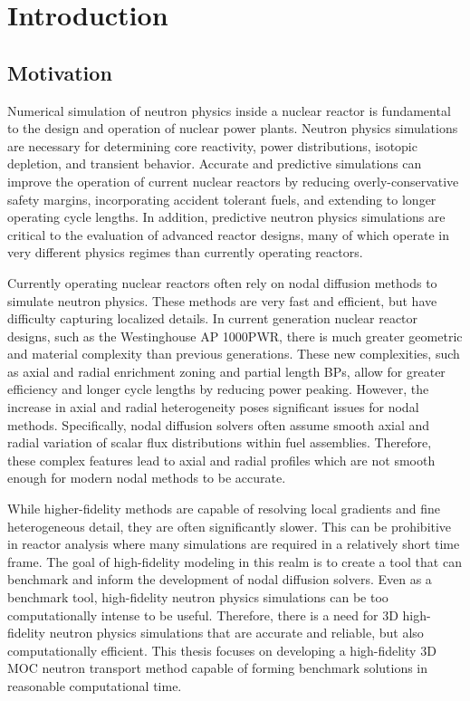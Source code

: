 \chapter{Introduction}
\label{chap:intro}

\section{Motivation}
\label{sec:chap1-motivation}


Numerical simulation of neutron physics inside a nuclear reactor is fundamental to the design and operation of nuclear power plants. Neutron physics simulations are necessary for determining core reactivity, power distributions, isotopic depletion, and transient behavior. Accurate and predictive simulations can improve the operation of current nuclear reactors by reducing overly-conservative safety margins, incorporating accident tolerant fuels, and extending to longer operating cycle lengths. In addition, predictive neutron physics simulations are critical to the evaluation of advanced reactor designs, many of which operate in very different physics regimes than currently operating reactors. 

Currently operating nuclear reactors often rely on nodal diffusion methods to simulate neutron physics. These methods are very fast and efficient, but have difficulty capturing localized details. In current generation nuclear reactor designs, such as the Westinghouse AP 1000\texttrademark \ac{PWR}, there is much greater geometric and material complexity than previous generations. These new complexities, such as axial and radial enrichment zoning and partial length \acp{BP}, allow for greater efficiency and longer cycle lengths by reducing power peaking. However, the increase in axial and radial heterogeneity poses significant issues for nodal methods. Specifically, nodal diffusion solvers often assume smooth axial and radial variation of scalar flux distributions within fuel assemblies. Therefore, these complex features  lead to axial and radial profiles which are not smooth enough for modern nodal methods to be accurate.

While higher-fidelity methods are capable of resolving local gradients and fine heterogeneous detail, they are often significantly slower. This can be prohibitive in reactor analysis where many simulations are required in a relatively short time frame. The goal of high-fidelity modeling in this realm is to create a tool that can benchmark and inform the development of nodal diffusion solvers. Even as a benchmark tool, high-fidelity neutron physics simulations can be too computationally intense to be useful. Therefore, there is a need for 3D high-fidelity neutron physics simulations that are accurate and reliable, but also computationally efficient. This thesis focuses on developing a high-fidelity 3D \ac{MOC} neutron transport method capable of forming benchmark solutions in reasonable computational time.

